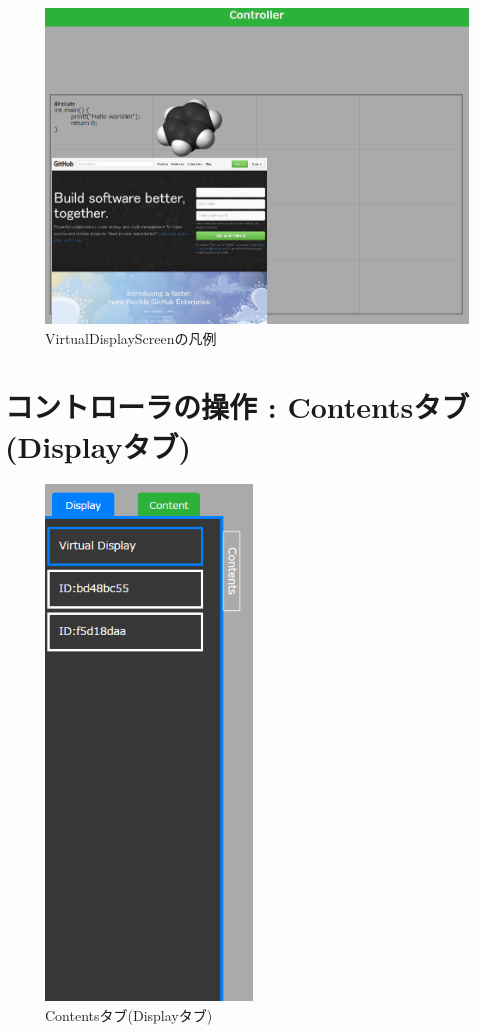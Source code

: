 \documentclass[a4paper,10pt,oneside]{jsbook}
\begin{document}
\begin{figure}[htbp]
	\begin{center}
		\includegraphics[width=15.5cm]{image/TDD_View.PNG}
	\end{center}
	\caption{VirtualDisplayScreenの凡例}
	\label{fig:vds}
\end{figure}

\newpage



\section{コントローラの操作 : Contentsタブ(Displayタブ)}
\begin{figure}
	\begin{center}
		\includegraphics[width=5.5cm]{image/Display_TAB_2conn.PNG}
	\end{center}
	\caption{Contentsタブ(Displayタブ)}
	\label{fig:contentstab}
\end{figure}
\end{document}
